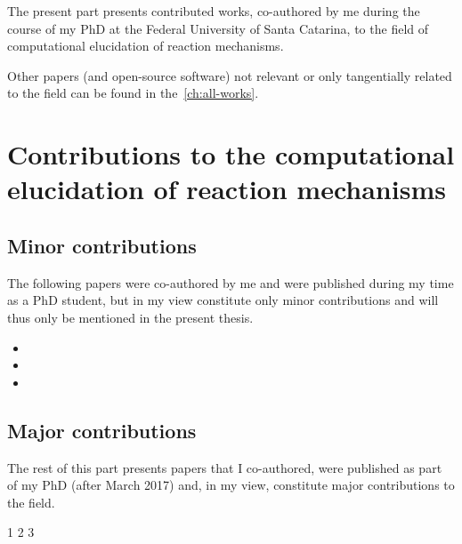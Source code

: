 The present part presents contributed works,
co-authored by me during the course of my PhD
at the Federal University of Santa Catarina,
to the field of computational elucidation of reaction mechanisms.

Other papers
(and open-source software)
not relevant or only tangentially related to the field
can be found in the~\cref{ch:all-works}.

\section{Contributions to the computational elucidation of
  reaction mechanisms}%
\label{sec:contributions}

\subsection{Minor contributions}%
\label{sec:minor-contributions}
The following papers were co-authored by me and were published
during my time as a PhD student,
but in my view constitute only minor contributions and
will thus only be mentioned in the present thesis.

\begin{itemize}
	\item {}
	\item {}
	\item {}
\end{itemize}

\subsection{Major contributions}%
\label{sec:major-contributions}
The rest of this part presents papers that I co-authored, were published as
part of my PhD (after March 2017) and, in my view, constitute major contributions
to the field.

{1}
{2}
{3}
